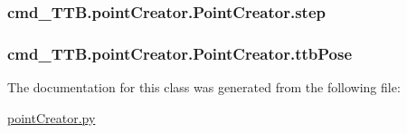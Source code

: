 \subsubsection[{\texorpdfstring{step}{step}}]{\setlength{\rightskip}{0pt plus 5cm}cmd\+\_\+\+T\+T\+B.\+point\+Creator.\+Point\+Creator.\+step}\hypertarget{classcmd__TTB_1_1pointCreator_1_1PointCreator_a73d089e287c772c0f448da4b18b6d1ab}{}\label{classcmd__TTB_1_1pointCreator_1_1PointCreator_a73d089e287c772c0f448da4b18b6d1ab}
\subsubsection[{\texorpdfstring{ttb\+Pose}{ttbPose}}]{\setlength{\rightskip}{0pt plus 5cm}cmd\+\_\+\+T\+T\+B.\+point\+Creator.\+Point\+Creator.\+ttb\+Pose}\hypertarget{classcmd__TTB_1_1pointCreator_1_1PointCreator_a21e4510de601ea33015ecd3b45cfafeb}{}\label{classcmd__TTB_1_1pointCreator_1_1PointCreator_a21e4510de601ea33015ecd3b45cfafeb}


The documentation for this class was generated from the following file\+:\begin{DoxyCompactItemize}
\item 
\hyperlink{pointCreator_8py}{point\+Creator.\+py}\end{DoxyCompactItemize}

